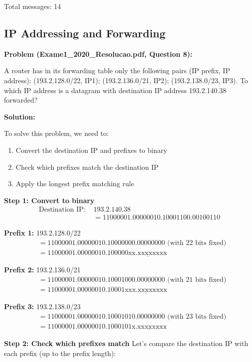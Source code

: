 \documentclass[11pt,a4paper]{article}
\begin{document}
Total messages: 14

\subsection{IP Addressing and Forwarding}
\textbf{Problem (Exame1\_2020\_Resolucao.pdf, Question 8):}

A router has in its forwarding table only the following pairs (IP prefix, IP address): (193.2.128.0/22, IP1); (193.2.136.0/21, IP2); (193.2.138.0/23, IP3). To which IP address is a datagram with destination IP address 193.2.140.38 forwarded?

\textbf{Solution:}

To solve this problem, we need to:
\begin{enumerate}
    \item Convert the destination IP and prefixes to binary
    \item Check which prefixes match the destination IP
    \item Apply the longest prefix matching rule
\end{enumerate}

\textbf{Step 1: Convert to binary}
\begin{align}
\text{Destination IP: } &193.2.140.38\\
&= 11000001.00000010.10001100.00100110
\end{align}

\textbf{Prefix 1:} 193.2.128.0/22
\begin{align}
&= 11000001.00000010.10000000.00000000 \text{ (with 22 bits fixed)}\\
&= 11000001.00000010.100000\underline{\text{xx.xxxxxxxx}}
\end{align}

\textbf{Prefix 2:} 193.2.136.0/21
\begin{align}
&= 11000001.00000010.10001000.00000000 \text{ (with 21 bits fixed)}\\
&= 11000001.00000010.10001\underline{\text{xxx.xxxxxxxx}}
\end{align}

\textbf{Prefix 3:} 193.2.138.0/23
\begin{align}
&= 11000001.00000010.10001010.00000000 \text{ (with 23 bits fixed)}\\
&= 11000001.00000010.1000101\underline{\text{x.xxxxxxxx}}
\end{align}

\textbf{Step 2: Check which prefixes match}
Let's compare the destination IP with each prefix (up to the prefix length):
\end{document}
